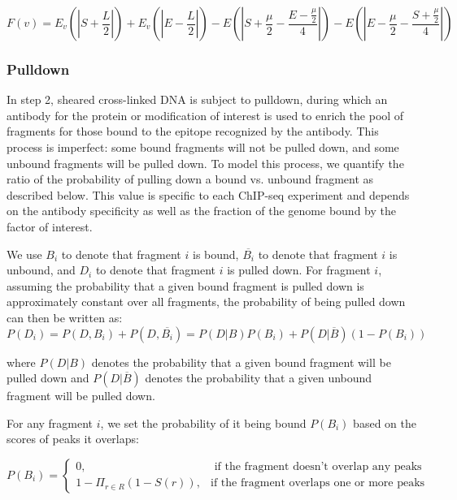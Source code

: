\documentclass[12pt]{article}
\begin{document}
\begin{equation}
F(v) = E_v \left( \left| S + \frac{L}{2} \right| \right) + E_v \left( \left| E - \frac{L}{2} \right| \right) - E\left( \left| S + \frac{\mu}{2} - \frac{E- \frac{\mu}{2}}{4} \right| \right) - E \left(\left| E- \frac{\mu}{2} - \frac{S + \frac{\mu}{2}}{4} \right|\right)
\end{equation}

\subsubsection*{Pulldown}
In step 2, sheared cross-linked DNA is subject to pulldown, during which an antibody for the protein or modification of interest is used to enrich the pool of fragments for those bound to the epitope recognized by the antibody.
This process is imperfect: some bound fragments will not be pulled down, and some unbound fragments will be pulled down.
To model this process, we quantify the ratio of the probability of pulling down a bound vs. unbound fragment as described below.
This value is specific to each ChIP-seq experiment and depends on the antibody specificity as well as the fraction of the genome bound by the factor of interest.

We use $B_i$ to denote that fragment $i$ is bound, $\overline{B_i}$ to denote that fragment $i$ is unbound, and $D_i$ to denote that fragment $i$ is pulled down. For fragment $i$, assuming the probability that a given bound fragment is pulled down is approximately constant over all fragments, the probability of being pulled down can then be written as:
\begin{equation} \label{eq:pulldown}
  P(D_i) = P(D, B_i) + P(D, \overline{B_i}) = P(D|B)P(B_i) + P(D|\overline{B})(1-P(B_i))
\end{equation}

where $P(D|B)$ denotes the probability that a given bound fragment will be pulled down and $P(D|\overline{B})$ denotes the probability that a given unbound fragment will be pulled down.

For any fragment $i$, we set the probability of it being bound $P(B_i)$ based on the scores of peaks it overlaps:

\begin{equation}
  P(B_i) = \begin{cases}
    0, & \text{ if the fragment doesn't overlap any peaks} \\
    1-\Pi_{r \in R} (1-S(r)), & \text {if the fragment overlaps one or more peaks}
    \end{cases}
\end{equation}
\end{document}
